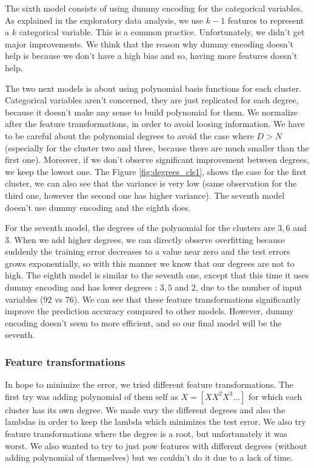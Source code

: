 \documentclass{article} %
\begin{document}
The sixth model consists of using dummy encoding for the categorical variables. As explained in the exploratory data analysis, we use $k-1$ features to represent a $k$ categorical variable. This is a common practice. Unfortunately, we didn't get major improvements. We think that the reason why dummy encoding doesn't help is because we don't have a high bias and so, having more features doesn't help.

The two next models is about using polynomial basis functions for each cluster. Categorical variables aren't concerned, they are just replicated for each degree, because it doesn't make any sense to build polynomial for them. We normalize after the feature transformations, in order to avoid loosing information. We have to be careful about the polynomial degrees to avoid the case where $D > N$ (especially for the cluster two and three, because there are much smaller than the first one). Moreover, if we don't observe significant improvement between degrees, we keep the lowest one. The Figure \ref{fig:degrees_cls1}, shows the case for the first cluster, we can also see that the variance is very low (same observation for the third one, however the second one has higher variance). The seventh model doesn't use dummy encoding and the eighth does.

For the seventh model, the degrees of the polynomial for the clusters are $3,6$ and $3$. When we add higher degrees, we can directly observe overfitting because suddenly the training error decreases to a value near zero and the test errors grows exponentially, so with this manner we know that our degrees are not to high. The eighth model is similar to the seventh one, except that this time it uses dummy encoding and has lower degrees : $3,5$ and $2$, due to the number of input variables ($92$ vs $76$). We can see that these feature transformations significantly improve the prediction accuracy compared to other models. However, dummy encoding doesn't seem to more efficient, and so our final model will be the seventh. 

\subsubsection{Feature transformations}

In hope to minimize the error, we tried different feature transformations. The first try was adding polynomial of them self as $X = [X X^2 X^3 ...]$ for which each cluster has its own degree. We made vary the different degrees and also the lambdas in order to keep the lambda which minimizes the test error. We also try feature transformations where the degree is a root, but unfortunately it was worst. We also wanted to try to just pow features with different degrees (without adding polynomial of themselves) but we couldn't do it due to a lack of time.
\end{document}
